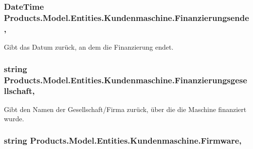 \subsubsection[{\texorpdfstring{Finanzierungsende}{Finanzierungsende}}]{\setlength{\rightskip}{0pt plus 5cm}Date\+Time Products.\+Model.\+Entities.\+Kundenmaschine.\+Finanzierungsende\hspace{0.3cm}{\ttfamily [get]}, {\ttfamily [set]}}\hypertarget{class_products_1_1_model_1_1_entities_1_1_kundenmaschine_a6e9a28482b4e1d9d2b9fa2967866317e}{}\label{class_products_1_1_model_1_1_entities_1_1_kundenmaschine_a6e9a28482b4e1d9d2b9fa2967866317e}


Gibt das Datum zurück, an dem die Finanzierung endet. 

\subsubsection[{\texorpdfstring{Finanzierungsgesellschaft}{Finanzierungsgesellschaft}}]{\setlength{\rightskip}{0pt plus 5cm}string Products.\+Model.\+Entities.\+Kundenmaschine.\+Finanzierungsgesellschaft\hspace{0.3cm}{\ttfamily [get]}, {\ttfamily [set]}}\hypertarget{class_products_1_1_model_1_1_entities_1_1_kundenmaschine_a005ebd49380b95416dfad3eb5ce822df}{}\label{class_products_1_1_model_1_1_entities_1_1_kundenmaschine_a005ebd49380b95416dfad3eb5ce822df}


Gibt den Namen der Gesellschaft/\+Firma zurück, über die die Maschine finanziert wurde. 

\subsubsection[{\texorpdfstring{Firmware}{Firmware}}]{\setlength{\rightskip}{0pt plus 5cm}string Products.\+Model.\+Entities.\+Kundenmaschine.\+Firmware\hspace{0.3cm}{\ttfamily [get]}, {\ttfamily [set]}}\hypertarget{class_products_1_1_model_1_1_entities_1_1_kundenmaschine_a9f391606a9545d39e93fbc31da7973df}{}\label{class_products_1_1_model_1_1_entities_1_1_kundenmaschine_a9f391606a9545d39e93fbc31da7973df}


